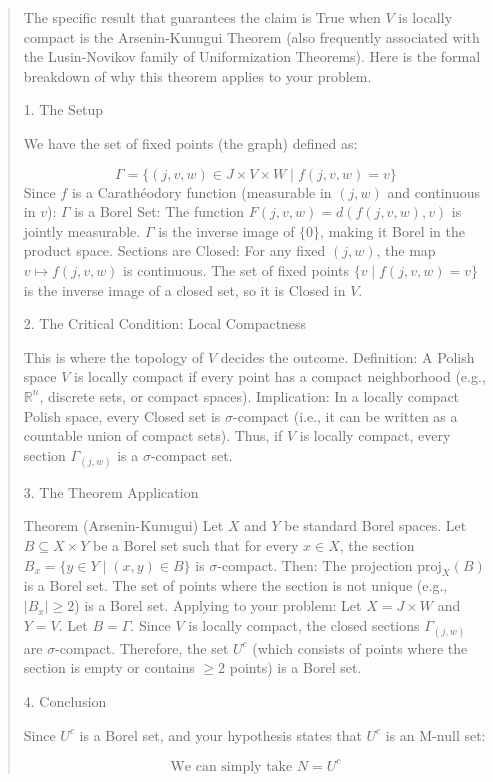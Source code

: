 \begin{Rem}
{\begin{quote}
The specific result that guarantees the claim is True when $V$ is locally compact is the Arsenin-Kunugui Theorem (also frequently associated with the Lusin-Novikov family of Uniformization Theorems).
Here is the formal breakdown of why this theorem applies to your problem.

1. The Setup

We have the set of fixed points (the graph) defined as:


$$\Gamma = \{ (j, v, w) \in J \times V \times W \mid f(j, v, w) = v \}$$
Since $f$ is a Carathéodory function (measurable in $(j,w)$ and continuous in $v$):
$\Gamma$ is a Borel Set: The function $F(j,v,w) = d(f(j,v,w), v)$ is jointly measurable. $\Gamma$ is the inverse image of $\{0\}$, making it Borel in the product space.
Sections are Closed: For any fixed $(j, w)$, the map $v \mapsto f(j, v, w)$ is continuous. The set of fixed points $\{ v \mid f(j,v,w)=v \}$ is the inverse image of a closed set, so it is Closed in $V$.

2. The Critical Condition: Local Compactness

This is where the topology of $V$ decides the outcome.
Definition: A Polish space $V$ is locally compact if every point has a compact neighborhood (e.g., $\mathbb{R}^n$, discrete sets, or compact spaces).
Implication: In a locally compact Polish space, every Closed set is $\sigma$-compact (i.e., it can be written as a countable union of compact sets).
Thus, if $V$ is locally compact, every section $\Gamma_{(j,w)}$ is a $\sigma$-compact set.

3. The Theorem Application

Theorem (Arsenin-Kunugui)
Let $X$ and $Y$ be standard Borel spaces. Let $B \subseteq X \times Y$ be a Borel set such that for every $x \in X$, the section $B_x = \{ y \in Y \mid (x, y) \in B \}$ is $\sigma$-compact.
Then:
The projection $\text{proj}_X(B)$ is a Borel set.
The set of points where the section is not unique (e.g., $|B_x| \ge 2$) is a Borel set.
Applying to your problem:
Let $X = J \times W$ and $Y = V$.
Let $B = \Gamma$.
Since $V$ is locally compact, the closed sections $\Gamma_{(j,w)}$ are $\sigma$-compact.
Therefore, the set $U^c$ (which consists of points where the section is empty or contains $\ge 2$ points) is a Borel set.

4. Conclusion

Since $U^c$ is a Borel set, and your hypothesis states that $U^c$ is an M-null set:


$$\text{We can simply take } N = U^c$$


\end{quote}}
\end{Rem}
